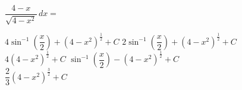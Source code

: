 \begin{questions}
    \question $\dfrac{4 - x}{\sqrt{4 - x^2}} \, dx = $ \\

    \begin{oneparchoices}
        \choice $4\sin^{-1} \left(\dfrac{x}{2}\right) + \left(4 - x^2\right)^{\frac{1}{2}} + C$
        \choice $2\sin^{-1} \left(\dfrac{x}{2}\right) + \left(4 - x^2\right)^{\frac{1}{2}} + C$ \\[11pt]
        \makebox[0.035\textwidth] \choice $4\left(4 - x^2\right)^{\frac{1}{2}} + C$
        \makebox[0.42\textwidth] \choice $\sin^{-1} \left(\dfrac{x}{2}\right) - \left(4 - x^2\right)^{\frac{1}{2}} + C$ \\[11pt]
        \makebox[0.035\textwidth] \choice $\dfrac{2}{3}\left(4 - x^2\right)^{\frac{3}{2}} + C$
    \end{oneparchoices} \par \horizontalline
\end{questions}